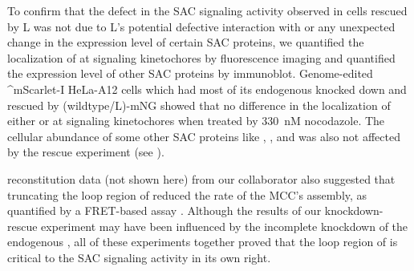 To confirm that the defect in the SAC signaling activity observed in cells rescued by \textDelta{}L was not due to \textDelta{}L's potential defective interaction with  or any unexpected change in the expression level of certain SAC proteins, we quantified the localization of  at signaling kinetochores by fluorescence imaging and quantified the expression level of other SAC proteins by immunoblot. Genome-edited ^mScarlet-I HeLa-A12 cells which had most of its endogenous  knocked down and rescued by (wildtype/\textDelta{}L)-mNG showed that no difference in the localization of either  or  at signaling kinetochores when treated by \SI{330}{nM} nocodazole. The cellular abundance of some other SAC proteins like , , and  was also not affected by the rescue experiment (see ).

 reconstitution data (not shown here) from our collaborator also suggested that truncating the loop region of  reduced the rate of the MCC's assembly, as quantified by a FRET-based assay \cite{Faesen2017, BUB1-CDC20-MAD1}. Although the results of our knockdown-rescue experiment may have been influenced by the incomplete knockdown of the endogenous , all of these experiments together proved that the loop region of  is critical to the SAC signaling activity in its own right.